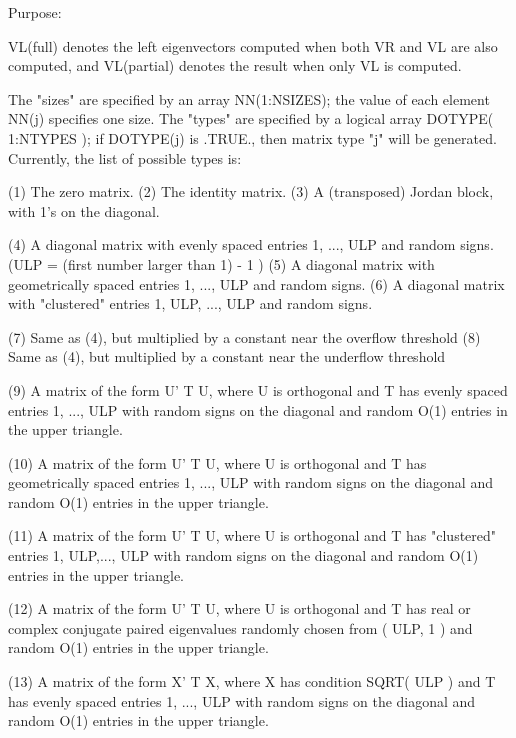 \begin{DoxyParagraph}{Purpose\+: }
\begin{DoxyVerb}
      VL(full) denotes the left eigenvectors computed when both VR
      and VL are also computed, and VL(partial) denotes the result
      when only VL is computed.

    The "sizes" are specified by an array NN(1:NSIZES); the value of
    each element NN(j) specifies one size.
    The "types" are specified by a logical array DOTYPE( 1:NTYPES );
    if DOTYPE(j) is .TRUE., then matrix type "j" will be generated.
    Currently, the list of possible types is:

    (1)  The zero matrix.
    (2)  The identity matrix.
    (3)  A (transposed) Jordan block, with 1's on the diagonal.

    (4)  A diagonal matrix with evenly spaced entries
         1, ..., ULP  and random signs.
         (ULP = (first number larger than 1) - 1 )
    (5)  A diagonal matrix with geometrically spaced entries
         1, ..., ULP  and random signs.
    (6)  A diagonal matrix with "clustered" entries 1, ULP, ..., ULP
         and random signs.

    (7)  Same as (4), but multiplied by a constant near
         the overflow threshold
    (8)  Same as (4), but multiplied by a constant near
         the underflow threshold

    (9)  A matrix of the form  U' T U, where U is orthogonal and
         T has evenly spaced entries 1, ..., ULP with random signs
         on the diagonal and random O(1) entries in the upper
         triangle.

    (10) A matrix of the form  U' T U, where U is orthogonal and
         T has geometrically spaced entries 1, ..., ULP with random
         signs on the diagonal and random O(1) entries in the upper
         triangle.

    (11) A matrix of the form  U' T U, where U is orthogonal and
         T has "clustered" entries 1, ULP,..., ULP with random
         signs on the diagonal and random O(1) entries in the upper
         triangle.

    (12) A matrix of the form  U' T U, where U is orthogonal and
         T has real or complex conjugate paired eigenvalues randomly
         chosen from ( ULP, 1 ) and random O(1) entries in the upper
         triangle.

    (13) A matrix of the form  X' T X, where X has condition
         SQRT( ULP ) and T has evenly spaced entries 1, ..., ULP
         with random signs on the diagonal and random O(1) entries
         in the upper triangle.


\end{DoxyVerb}
\end{DoxyParagraph}
